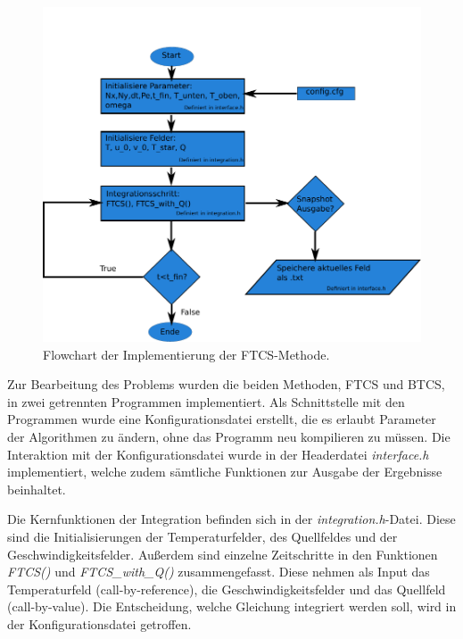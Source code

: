\begin{figure}\centering
\includegraphics[height=0.45\textheight]{FTCSflow.pdf}\caption{Flowchart der Implementierung der FTCS-Methode.}\label{fig:FTCS}
\end{figure}

Zur Bearbeitung des Problems wurden die beiden Methoden, FTCS und BTCS, in zwei getrennten Programmen implementiert. Als Schnittstelle mit den Programmen wurde eine Konfigurationsdatei erstellt, die es erlaubt Parameter der Algorithmen zu ändern, ohne das Programm neu kompilieren zu müssen.
Die Interaktion mit der Konfigurationsdatei wurde in der Headerdatei \emph{interface.h} implementiert, welche zudem sämtliche Funktionen zur Ausgabe der Ergebnisse beinhaltet.

Die Kernfunktionen der Integration befinden sich in der \emph{integration.h}-Datei. Diese sind die Initialisierungen der Temperaturfelder, des Quellfeldes und der Geschwindigkeitsfelder.
Außerdem sind einzelne Zeitschritte in den Funktionen \emph{FTCS()} und \emph{FTCS\_with\_Q()} zusammengefasst. Diese nehmen als Input das Temperaturfeld (call-by-reference), die Geschwindigkeitsfelder und das Quellfeld (call-by-value).
Die Entscheidung, welche Gleichung integriert werden soll, wird in der Konfigurationsdatei getroffen.
\FloatBarrier
\newpage

